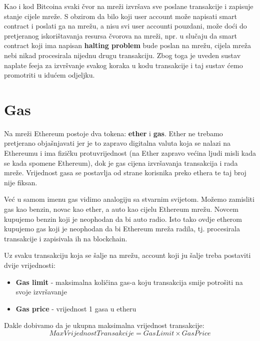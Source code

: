 \documentclass[12pt]{report}
\begin{document}
Kao i kod Bitcoina svaki čvor na mreži izvršava sve poslane transakcije i zapisuje stanje cijele mreže. S obzirom da bilo koji user account može napisati smart contract i poslati ga na mrežu, a nisu svi user accounti pouzdani, može doći do pretjeranog iskorištavanja resursa čvorova na mreži, npr. u slučaju da smart contract koji ima napisan \textbf{halting problem} bude poslan na mrežu, cijela mreža nebi nikad procesirala nijednu drugu transakciju. Zbog toga je uveden sustav naplate feeja za izvršvanje svakog koraka u kodu transakcije i taj sustav ćemo promotriti u idućem odjeljku.

\section{Gas}

Na mreži Ethereum postoje dva tokena: \textbf{ether} i \textbf{gas}. Ether ne trebamo pretjerano objašnjavati jer je to zapravo digitalna valuta koja se nalazi na Ethereumu i ima fizičku protuvrijednost (na Ether zapravo većina ljudi misli kada se kada spomene Ethereum), dok je gas cijena izvršavanja transakcija i rada mreže. Vrijednost gasa se postavlja od strane korisnika preko ethera te taj broj nije fiksan.

\begin{tcolorbox}
Već u samom imenu gas vidimo analogiju sa stvarnim svijetom. Možemo zamisliti gas kao benzin, novac kao ether, a auto kao cijelu Ethereum mrežu. Novcem kupujemo benzin koji je neophodan da bi auto radio. Isto tako ovdje etherom kupujemo gas koji je neophodan da bi Ethereum mreža radila, tj. procesirala transakcije i zapisivala ih na blockchain.
\end{tcolorbox}

Uz svaku transakciju koja se šalje na mrežu, account koji ju šalje treba postaviti dvije vrijednosti:

\begin{itemize}
    \item \textbf{Gas limit} - maksimalna količina gas-a koju transakcija smije potrošiti na svoje izvršavanje
    \item \textbf{Gas price} - vrijednost 1 gasa u etheru
\end{itemize}

Dakle dobivamo da je ukupna maksimalna vrijednost transakcije:
\begin{equation}
    MaxVrijednostTransakcije = GasLimit \times GasPrice
\end{equation}
\end{document}
